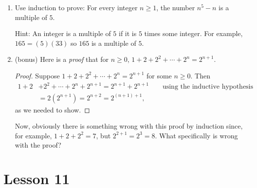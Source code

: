 \documentclass[11pt]{amsart}
\begin{document}
\begin{enumerate}
\item Use induction to prove: For every integer $n\geq 1$, the number $n^5-n$ is a multiple of $5$.

Hint: An integer is a multiple of $5$ if it is $5$ times some integer. For example,
$165 = (5)(33)$ so $165$ is a multiple of $5$.\\[5pt]

\item   (bonus) Here is a {\itshape proof} that for $n\geq 0$,  $1+ 2 + 2^2 +  \cdots + 2^n = 2^{n+1}$.
\begin{proof}
Suppose $1+ 2 + 2^2 +  \cdots + 2^n = 2^{n+1}$ for some $n\geq 0$. Then
\begin{align*}
 1+ 2 &+ 2^2 +  \cdots + 2^n  + 2^{n+1} = 2^{n+1} +2^{n+1} \qquad\text{using the inductive hypothesis}\\
 &= 2(2^{n+1}) = 2^{n+2} = 2^{(n+1)+1},
 \end{align*}
 as we needed to show.
 \end{proof}
 
 Now, obviously there is something wrong with this proof by induction since, for example,
 $1+2+2^2 = 7$, but $2^{2+1} = 2^3 = 8$. What specifically is wrong with the proof?


\end{enumerate}

\section{Lesson 11}
\end{document}
